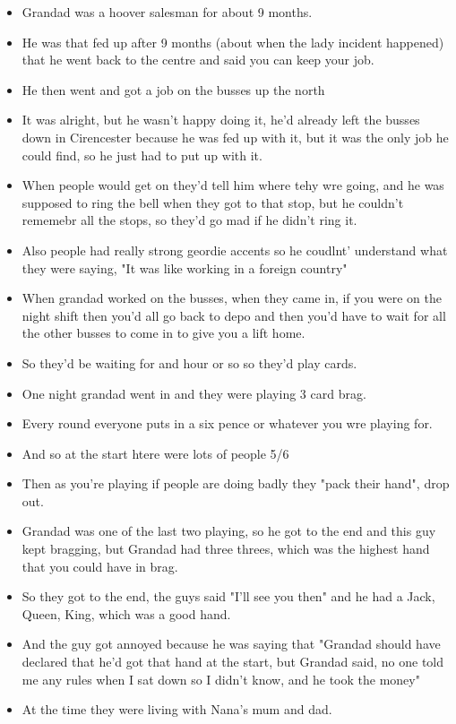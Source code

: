 \documentclass[10pt,twocolumn,letterpaper]{article}
\begin{document}
\begin{itemize}
    \item Grandad was a hoover salesman for about 9 months.
    \item He was that fed up after 9 months (about when the lady incident happened) that he went back to the centre and said you can keep your job.
    \item He then went and got a job on the busses up the north
    \item It was alright, but he wasn't happy doing it, he'd already left the busses down in Cirencester because he was fed up with it, but it was the only job he could find, so he just had to put up with it.
    \item When people would get on they'd tell him where tehy wre going, and he was supposed to ring the bell when they got to that stop, but he couldn't rememebr all the stops, so they'd go mad if he didn't ring it.
    \item Also people had really strong geordie accents so he coudlnt' understand what they were saying, "It was like working in a foreign country"
    \item When grandad worked on the busses, when they came in, if you were on the night shift then you'd all go back to depo and then you'd have to wait for all the other busses to come in to give you a lift home.
    \item So they'd be waiting for and hour or so so they'd play cards.
    \item One night grandad went in and they were playing 3 card brag. 
    \item Every round everyone puts in a six pence or whatever you wre playing for.
    \item And so at the start htere were lots of people 5/6
    \item Then as you're playing if people are doing badly they "pack their hand", drop out.
    \item Grandad was one of the last two playing, so he got to the end and this guy kept bragging, but Grandad had three threes, which was the highest hand that you could have in brag.
    \item So they got to the end, the guys said "I'll see you then" and he had a Jack, Queen, King, which was a good hand. 
    \item And the guy got annoyed because he was saying that "Grandad should have declared that he'd got that hand at the start, but Grandad said, no one told me any rules when I sat down so I didn't know, and he took the money"
    \item At the time they were living with Nana's mum and dad.

\end{itemize}
\end{document}

